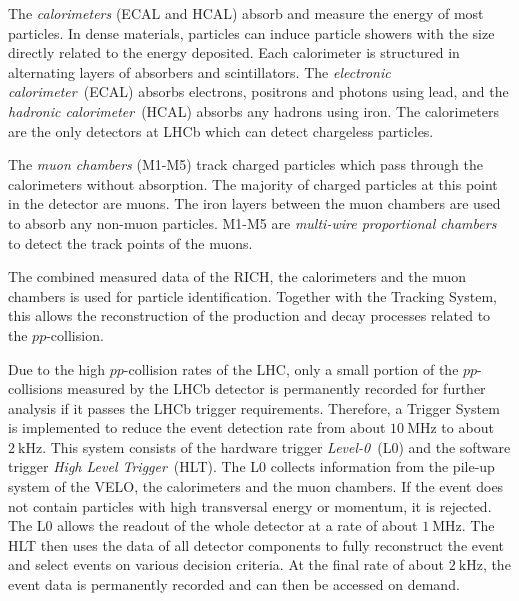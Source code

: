 The \emph{calorimeters} (ECAL and HCAL) absorb and measure the energy of most particles.
In dense materials, particles can induce particle showers with the size directly related to the energy deposited.
Each calorimeter is structured in alternating layers of absorbers and scintillators. 
The \emph{electronic calorimeter}~(ECAL) absorbs electrons, positrons and photons using lead, and the \emph{hadronic calorimeter}~(HCAL) absorbs any hadrons using iron.
The calorimeters are the only detectors at LHCb which can detect chargeless particles.

The \emph{muon chambers} (M1-M5) track charged particles which pass through the calorimeters without absorption.
The majority of charged particles at this point in the detector are muons.
The iron layers between the muon chambers are used to absorb any non-muon particles.
M1-M5 are \emph{multi-wire proportional chambers} to detect the track points of the muons.

The combined measured data of the RICH, the calorimeters and the muon chambers is used for particle identification.
Together with the Tracking System, this allows the reconstruction of the production and decay processes related to the $pp$-collision.

Due to the high $pp$-collision rates of the LHC, only a small portion of the $pp$-collisions measured by the LHCb detector is permanently recorded for further analysis if it passes the LHCb trigger requirements.
Therefore, a Trigger System is implemented to reduce the event detection rate from about $\qty{10}{\MHz}$ to about $\qty{2}{\kHz}$.
This system consists of the hardware trigger \emph{Level-0}~(L0) and the software trigger \emph{High Level Trigger}~(HLT).
The L0 collects information from the pile-up system of the VELO, the calorimeters and the muon chambers.
If the event does not contain particles with high transversal energy or momentum, it is rejected.
The L0 allows the readout of the whole detector at a rate of about $\qty{1}{\MHz}$.
The HLT then uses the data of all detector components to fully reconstruct the event and select events on various decision criteria.
At the final rate of about $\qty{2}{\kHz}$, the event data is permanently recorded and can then be accessed on demand.
